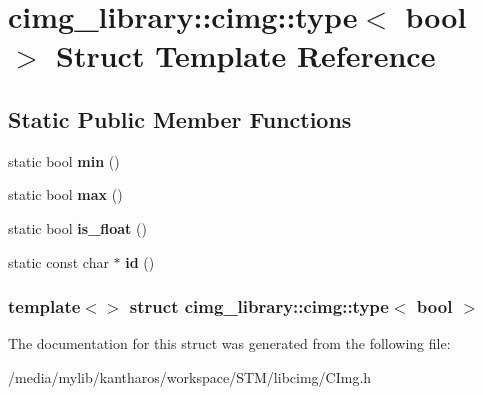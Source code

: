 \hypertarget{structcimg__library_1_1cimg_1_1type_3_01bool_01_4}{
\section{cimg\_\-library::cimg::type$<$ bool $>$ Struct Template Reference}
\label{structcimg__library_1_1cimg_1_1type_3_01bool_01_4}
}
\subsection*{Static Public Member Functions}
\begin{DoxyCompactItemize}
\item 
\hypertarget{structcimg__library_1_1cimg_1_1type_3_01bool_01_4_a819c8824c5bfc7b1383fcefd0e682dad}{
static bool {\bfseries min} ()}
\label{structcimg__library_1_1cimg_1_1type_3_01bool_01_4_a819c8824c5bfc7b1383fcefd0e682dad}

\item 
\hypertarget{structcimg__library_1_1cimg_1_1type_3_01bool_01_4_a989dafa9caa7599f4ebe07dfa2d65d42}{
static bool {\bfseries max} ()}
\label{structcimg__library_1_1cimg_1_1type_3_01bool_01_4_a989dafa9caa7599f4ebe07dfa2d65d42}

\item 
\hypertarget{structcimg__library_1_1cimg_1_1type_3_01bool_01_4_ab3d853560f99ade46f2b4f77edf3a395}{
static bool {\bfseries is\_\-float} ()}
\label{structcimg__library_1_1cimg_1_1type_3_01bool_01_4_ab3d853560f99ade46f2b4f77edf3a395}

\item 
\hypertarget{structcimg__library_1_1cimg_1_1type_3_01bool_01_4_a51c7d04a917c8a3650a697863c9753e8}{
static const char $\ast$ {\bfseries id} ()}
\label{structcimg__library_1_1cimg_1_1type_3_01bool_01_4_a51c7d04a917c8a3650a697863c9753e8}

\end{DoxyCompactItemize}
\subsubsection*{template$<$$>$ struct cimg\_\-library::cimg::type$<$ bool $>$}



The documentation for this struct was generated from the following file:\begin{DoxyCompactItemize}
\item 
/media/mylib/kantharos/workspace/STM/libcimg/CImg.h\end{DoxyCompactItemize}
